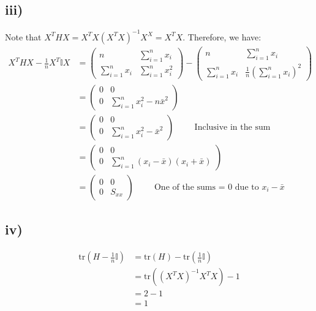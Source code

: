 \documentclass{article}
\begin{document}
\subsection*{iii)}
Note that $X^THX = X^TX(X^TX)^{-1}X^X = X^TX$. Therefore, we have:
\begin{align*}
    X^THX - \frac{1}{n}X^T\mathbb{I}X &= \begin{pmatrix}
        n & \sum_{i=1}^n x_i \\ 
        \sum_{i=1}^n x_i & \sum_{i=1}^n x_i^2
    \end{pmatrix} - \begin{pmatrix}
        n & \sum_{i=1}^nx_i \\
        \sum_{i=1}^nx_i & \frac{1}{n}\left(\sum_{i=1}^nx_i\right)^2
    \end{pmatrix} \\  &= \begin{pmatrix}
        0 & 0 \\
        0 & \sum_{i=1}^n x_i^2 - n\bar{x}^2 
    \end{pmatrix} \\ 
    &= \begin{pmatrix}
        0 & 0 \\
        0 & \sum_{i=1}^n x_i^2 - \bar{x}^2
    \end{pmatrix} \hspace{1cm} \text{Inclusive in the sum} \\ 
    &= \begin{pmatrix}
        0 & 0 \\ 
        0 & \sum_{i=1}^n (x_i - \bar{x})(x_i + \bar{x}) 
    \end{pmatrix} \\ 
    &= \begin{pmatrix}
        0 & 0 \\ 
        0 & S_{xx}
    \end{pmatrix} \hspace{1cm} \text{One of the sums = 0 due to $x_i - \bar{x}$}
\end{align*}

\subsection*{iv)}
\begin{align*}
    \text{tr}\left(H - \frac{1}{n}\mathbb{I}\right) &= \text{tr}(H) - \text{tr}\left(\frac{1}{n}\mathbb{I}\right) \\ 
    &= \text{tr}((X^TX)^{-1}X^TX) - 1 \\ 
    &= 2 - 1 \hspace{1cm} \text{}\\ 
    &= 1
\end{align*}
\newpage 
\end{document}
